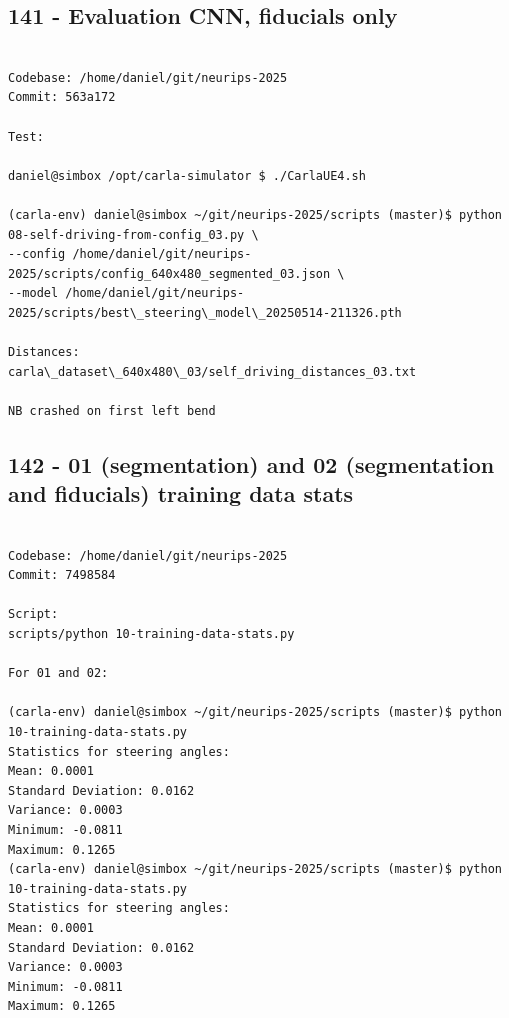 \subsection{141 - Evaluation CNN, fiducials only}
\label{app_res:141}
\begin{verbatim}

Codebase: /home/daniel/git/neurips-2025
Commit: 563a172

Test:

daniel@simbox /opt/carla-simulator $ ./CarlaUE4.sh

(carla-env) daniel@simbox ~/git/neurips-2025/scripts (master)$ python 08-self-driving-from-config_03.py \
--config /home/daniel/git/neurips-2025/scripts/config_640x480_segmented_03.json \
--model /home/daniel/git/neurips-2025/scripts/best\_steering\_model\_20250514-211326.pth

Distances:
carla\_dataset\_640x480\_03/self_driving_distances_03.txt

NB crashed on first left bend
\end{verbatim}

\subsection{142 - 01 (segmentation) and 02 (segmentation and fiducials) training data stats}
\label{app_res:142}

\begin{verbatim}

Codebase: /home/daniel/git/neurips-2025
Commit: 7498584

Script:
scripts/python 10-training-data-stats.py

For 01 and 02:

(carla-env) daniel@simbox ~/git/neurips-2025/scripts (master)$ python 10-training-data-stats.py 
Statistics for steering angles:
Mean: 0.0001
Standard Deviation: 0.0162
Variance: 0.0003
Minimum: -0.0811
Maximum: 0.1265
(carla-env) daniel@simbox ~/git/neurips-2025/scripts (master)$ python 10-training-data-stats.py 
Statistics for steering angles:
Mean: 0.0001
Standard Deviation: 0.0162
Variance: 0.0003
Minimum: -0.0811
Maximum: 0.1265


\end{verbatim}

